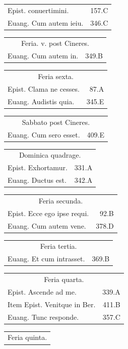 \documentclass[a5paper,10pt]{book}
\begin{document}
\begin{multicols*}{2}
\begin{tabular}{l r}
Epist. conuertimini. & 157.C\\
Euang. Cum autem ieiu. & 346.C\\
\end{tabular}
\begin{tabular}{l r}
\multicolumn{2}{c}{\color{red} Feria. v. post Cineres.}\\
Euang. Cum autem in. & 349.B\\
\end{tabular}
\begin{tabular}{l r}
\multicolumn{2}{c}{\color{red} Feria sexta.}\\
Epist. Clama ne cesses. & 87.A\\
Euang. Audistis quia. & 345.E\\
\end{tabular}
\begin{tabular}{l r}
\multicolumn{2}{c}{\color{red} Sabbato post Cineres.}\\
Euang. Cum sero esset. & 409.E\\
\end{tabular}
\begin{tabular}{l r}
\multicolumn{2}{c}{\color{red} Dominica quadrage.}\\
Epist. Exhortamur. & 331.A\\
Euang. Ductus est. & 342.A\\
\end{tabular}
\begin{tabular}{l r}
\multicolumn{2}{c}{\color{red} Feria secunda.}\\
Epist. Ecce ego ipse requi. & 92.B\\
Euang. Cum autem vene. & 378.D\\
\end{tabular}
\begin{tabular}{l r}
\multicolumn{2}{c}{\color{red} Feria tertia.}\\
Euang. Et cum intrasset. & 369.B\\
\end{tabular}
\begin{tabular}{l r}
\multicolumn{2}{c}{\color{red} Feria quarta.}\\
Epist. Ascende ad me. & 339.A\\
Item Epist. Venitque in Ber. & 411.B\\
Euang. Tunc responde. & 357.C\\
\end{tabular}
\begin{tabular}{l r}
\multicolumn{2}{c}{\color{red} Feria quinta.}\\

\end{tabular}
\end{multicols*}
\end{document}
